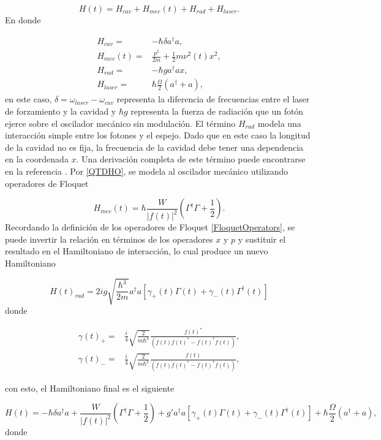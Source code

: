\documentclass[10pt,a4paper]{report}
\begin{document}
\begin{equation}
H(t) = H_{cav} + H_{mec}(t) + H_{rad} + H_{laser}.
\end{equation} En donde

\begin{align}
H_{cav} =& -\hbar \delta a^\dagger a,\\
H_{mec}(t) =& \frac{p^2}{2m} + \frac{1}{2}m \nu^2 (t) x^2,\\
H_{rad} =& -\hbar g a^\dagger a x,\\
H_{laser} =& \hbar\frac{\Omega}{2}(a^\dagger + a),
\end{align} en este caso, $\delta = \omega_{laser} - \omega_{cav}$ representa la diferencia de frecuencias entre el laser de forzamiento y la cavidad y $\hbar g$ representa la fuerza de radiación que un fotón ejerce sobre el oscilador mecánico sin modulación. El término $H_{rad}$ modela una interacción simple entre los fotones y el espejo. Dado que en este caso la longitud de la cavidad no es fija, la frecuencia de la cavidad debe tener una dependencia en la coordenada $x$. Una derivación completa de este término puede encontrarse en la referencia \cite{KippenberCO}. Por \eqref{QTDHO}, se modela al oscilador mecánico utilizando operadores de Floquet

\begin{equation}
H_{mec}(t) = \hbar\frac{W}{|f(t)|^2}(\Gamma^\dagger \Gamma + \frac{1}{2}).
\end{equation} Recordando la definición de los operadores de Floquet \eqref{FloquetOperators}, se puede invertir la relación en términos de los operadores $x$ y $p$ y sustituir el resultado en el Hamiltoniano de interacción, lo cual produce un nuevo Hamiltoniano\cite{TesisMaestria}

\begin{equation}
H(t)_{rad} = 2ig\sqrt{\frac{\hbar^3}{2m}}  a^\dagger a[\gamma_+(t)\Gamma (t) +\gamma_-(t)\Gamma^\dagger (t)]
\end{equation} donde

\begin{align}
\gamma(t)_+ =& \frac{i}{4}\sqrt{\frac{2}{m\hbar^3}} \frac{f(t)^*}{(\dot{f}(t)f(t)^*-\dot{f}(t)^*f(t))},\\
\gamma(t)_- =& \frac{i}{4}\sqrt{\frac{2}{m\hbar^3}} \frac{f(t)}{(\dot{f}(t)f(t)^*-\dot{f}(t)^*f(t))},
\end{align}

con esto, el Hamiltoniano final es el siguiente

\begin{equation}\label{LaserCoolingHamiltonian}
H(t) = -\hbar \delta a^\dagger a + \frac{W}{|f(t)|^2}(\Gamma^\dagger \Gamma + \frac{1}{2}) +  g'a^\dagger a[\gamma_+(t)\Gamma (t) +\gamma_-(t)\Gamma^\dagger (t)] + \hbar\frac{\Omega}{2}(a^\dagger + a),
\end{equation} donde 
\end{document}
